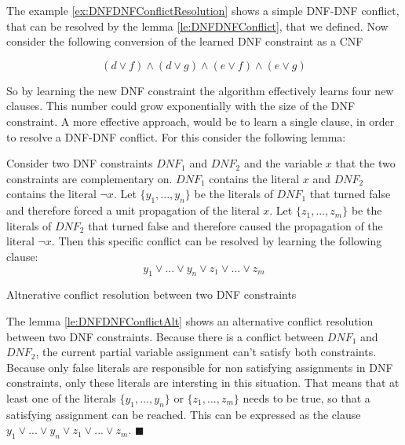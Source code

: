 The example \ref{ex:DNFDNFConflictResolution} shows a simple DNF-DNF conflict, that can be resolved by the lemma \ref{le:DNFDNFConflict}, that we defined. Now consider the following conversion of the learned DNF constraint as a CNF

\begin{leftbar}
\begin{displaymath}
(d \vee f) \wedge (d \vee g) \wedge (e \vee f) \wedge (e \vee g)
\end{displaymath}
\end{leftbar}

So by learning the new DNF constraint the algorithm effectively learns four new clauses. This number could grow exponentially with the size of the DNF constraint. A more effective approach, would be to learn a single clause, in order to resolve a DNF-DNF conflict. For this consider the following lemma:

\begin{lemma}
\begin{leftbar}
Consider two DNF constraints $DNF_1$ and $DNF_2$ and the variable $x$ that the two constraints are complementary on. $DNF_1$ contains the literal $x$ and $DNF_2$ contains the literal $\neg x$. Let $\{y_1,...,y_n\}$ be the literals of $DNF_1$ that turned false and therefore forced a unit propagation of the literal $x$. Let $\{z_1,...,z_m\}$ be the literals of $DNF_2$ that turned false and therefore caused the propagation of the literal $\neg x$. Then this specific conflict can be resolved by learning the following clause:
\begin{displaymath}
y_1 \vee ... \vee y_n \vee z_1 \vee ... \vee z_m
\end{displaymath}
\end{leftbar}
\caption{Altnerative conflict resolution between two DNF constraints}
\label{le:DNFDNFConflictAlt}
\end{lemma}

The lemma \ref{le:DNFDNFConflictAlt} shows an alternative conflict resolution between two DNF constraints. Because there is a conflict between $DNF_1$ and $DNF_2$, the current partial variable assignment can't satisfy both constraints. Because only false literals are responsible for non satisfying assignments in DNF constraints, only these literals are intersting in this situation. That means that at least one of the literals $\{y_1,...,y_n\}$ or $\{z_1,...,z_m\}$ needs to be true, so that a satisfying assignment can be reached. This can be expressed as the clause $y_1 \vee ... \vee y_n \vee z_1 \vee ... \vee z_m$. $\blacksquare$

